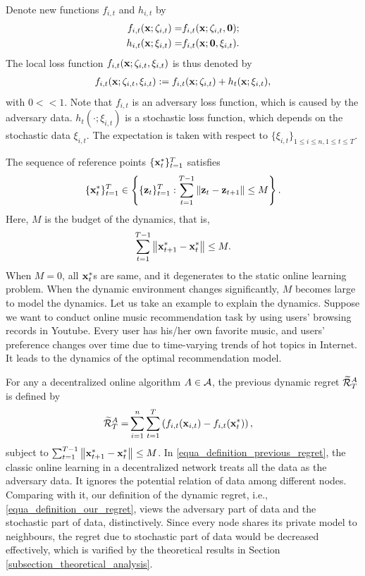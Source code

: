 \documentclass{article}
\begin{document}
Denote new functions $f_{i,t}$ and $h_{i,t}$ by 
\begin{align}
\nonumber
f_{i,t}({\bf x};\zeta_{i,t}) = & f_{i,t}({\bf x};\zeta_{i,t},{\bf 0}); \\ \nonumber
h_{i,t}({\bf x};\xi_{i,t}) = & f_{i,t}({\bf x};{\bf 0},\xi_{i,t}).
\end{align} The local loss function $f_{i,t}({\bf x};\zeta_{i,t},\xi_{i,t})$ is thus denoted by
\begin{align}
\nonumber
f_{i,t}({\bf x};\zeta_{i,t},\xi_{i,t}) :=   f_{i,t}({\bf x};\zeta_{i,t}) +   h_t({\bf x}; \xi_{i,t}), 
\end{align} with $0< <1$.   Note that $f_{i,t}$ is an adversary loss function, which is caused by the adversary data. $h_t(\cdot; \xi_{i,t})$ is a stochastic loss function, which depends on the stochastic data $\xi_{i,t}$. The expectation is taken with respect to $\{\xi_{i,t}\}_{1\le i\le n,1\le t\le T}$. 

The sequence of reference points $\{{\bf x}_t^\ast\}_{t=1}^T$ satisfies 
\begin{align}
\nonumber
\{{\bf x}_t^\ast\}_{t=1}^T \in \left\{ \{{\bf z}_t\}_{t=1}^{T} : \sum_{t=1}^{T-1} \left\lVert{\bf z}_t - {\bf z}_{t+1}\right\rVert \le M \right\}.
\end{align} Here, $M$ is the budget of the dynamics, that is,
\begin{align}
\label{equa_define_M}
\sum_{t=1}^{T-1} \left\lVert{\bf x}_{t+1}^\ast - {\bf x}_t^\ast\right\rVert \le M.
\end{align} When $M=0$, all ${\bf x}_t^\ast$s are same, and it degenerates to the static online learning problem. When the dynamic environment changes significantly, $M$ becomes large to model the dynamics. Let us take an example to explain the dynamics. Suppose we want to conduct online music recommendation task by using users' browsing records in Youtube. Every user has his/her own favorite music, and users' preference  changes over time due to time-varying trends of hot topics in Internet. It leads to the dynamics of the optimal recommendation model.  


For any a decentralized online algorithm $A \in {\mathcal{A}}$, the previous dynamic regret  $\widetilde{{\mathcal{R}}}_T^{A}$ is defined by
\begin{align}
\label{equa_definition_previous_regret}
\widetilde{{\mathcal{R}}}_T^{A} = &  \sum_{i=1}^n\sum_{t=1}^T \left(  f_{i,t}({\bf x}_{i,t}) - f_{i,t}({\bf x}_t^\ast)  \right),
\end{align} subject to $\sum_{t=1}^{T-1} \left\lVert{\bf x}_{t+1}^\ast - {\bf x}_t^\ast\right\rVert \le M$.  In \eqref{equa_definition_previous_regret}, the classic online learning in a decentralized network treats all the data as the adversary data. It ignores the potential relation of data among different nodes. Comparing with it, our definition of the dynamic regret, i.e., \eqref{equa_definition_our_regret}, views the adversary part of data and the stochastic part of data, distinctively.  Since every node shares its private model to neighbours, the regret due to stochastic part of data would be decreased effectively, which is varified by the theoretical results in Section \ref{subsection_theoretical_analysis}.
\end{document}
